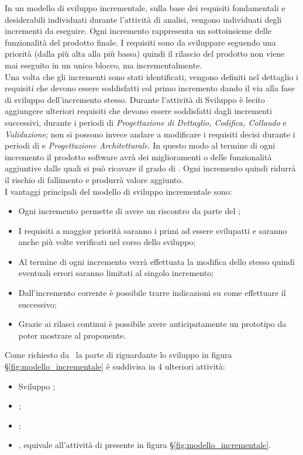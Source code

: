 In un modello di sviluppo incrementale, sulla base dei requisiti fondamentali e desiderabili individuati durante l'attività di analisi, vengono individuati degli incrementi da eseguire. Ogni incremento rappresenta un sottoinsieme delle funzionalità del prodotto finale. I requisiti sono da sviluppare seguendo una priorità (dalla più alta alla più bassa) quindi il rilascio del prodotto non viene mai eseguito in un unico blocco, ma incrementalmente.\\
Una volta che gli incrementi sono stati identificati, vengono definiti nel dettaglio i requisiti che devono essere soddisfatti col primo incremento dando il via alla fase di sviluppo dell’incremento stesso.  Durante l’attività di Sviluppo è lecito aggiungere ulteriori requisiti che devono essere soddisfatti dagli incrementi successivi, durante i periodi di \textit{Progettazione di Dettaglio, Codifica, Collaudo} e \textit{Validazione}; non si possono invece andare a modificare i requisiti decisi durante i periodi di \textit{\AdR} e \textit{Progettazione Architetturale}. In questo modo al termine di ogni incremento il prodotto software avrà dei miglioramenti o delle funzionalità aggiuntive dalle quali si può ricavare il grado di . Ogni incremento quindi ridurrà il rischio di fallimento e produrrà valore aggiunto.\\
I vantaggi principali del modello di sviluppo incrementale sono:
\begin{itemize}
    \item Ogni incremento permette di avere un riscontro da parte del ;
    \item I requisiti a maggior priorità saranno i primi ad essere svilupatti e saranno anche più volte verificati nel corso dello sviluppo;
    \item Al termine di ogni incremento verrà effettuata la modifica dello stesso quindi eventuali errori saranno limitati al singolo incremento;
    \item Dall'incremento corrente è possibile trarre indicazioni su come effettuare il successivo;
    \item Grazie ai rilasci continui è possibile avere anticipatamente un prototipo da poter mostrare al proponente.
\end{itemize}

Come richiesto da \Proponente\ la parte di  riguardante lo sviluppo in figura \S\ref{fig:modello_incrementale} è suddivisa in 4 ulteriori attività:
\begin{itemize}
    \item Sviluppo ;
    \item {};
    \item {};
    \item {} , equivale all'attività di  presente in figura \S\ref{fig:modello_incrementale}.
\end{itemize}
